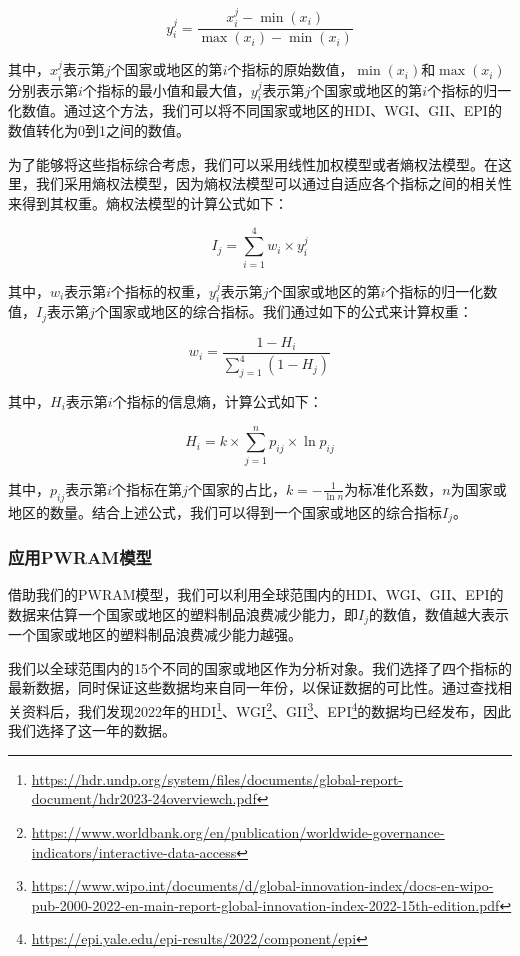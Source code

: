 \documentclass[UTF8, fontset=windows]{mcmthesis}
\begin{document}
\begin{equation}
y_{i}^{j} = \frac{x_{i}^{j} - \min(x_{i})}{\max(x_{i}) - \min(x_{i})}
\end{equation}

其中，$x_i^j$表示第$j$个国家或地区的第$i$个指标的原始数值，$\min(x_i)$和$\max(x_i)$分别表示第$i$个指标的最小值和最大值，$y_i^j$表示第$j$个国家或地区的第$i$个指标的归一化数值。通过这个方法，我们可以将不同国家或地区的HDI、WGI、GII、EPI的数值转化为0到1之间的数值。

为了能够将这些指标综合考虑，我们可以采用线性加权模型或者熵权法模型。在这里，我们采用熵权法模型，因为熵权法模型可以通过自适应各个指标之间的相关性来得到其权重。熵权法模型的计算公式如下：

\begin{equation}
I_j = \sum_{i=1}^{4} w_i \times y_i^j
\end{equation}

其中，$w_i$表示第$i$个指标的权重，$y_i^j$表示第$j$个国家或地区的第$i$个指标的归一化数值，$I_j$表示第$j$个国家或地区的综合指标。我们通过如下的公式来计算权重：

\begin{equation}
w_i = \frac{1 - H_i}{\sum_{j=1}^{4} (1 - H_j)}
\end{equation}

其中，$H_i$表示第$i$个指标的信息熵，计算公式如下：

\begin{equation}
H_i = k \times \sum_{j=1}^{n} p_{ij} \times \ln p_{ij}
\end{equation}

其中，$p_{ij}$表示第$i$个指标在第$j$个国家的占比，$k=-\frac{1}{\ln n}$为标准化系数，$n$为国家或地区的数量。结合上述公式，我们可以得到一个国家或地区的综合指标$I_j$。

\subsubsection{应用PWRAM模型}

借助我们的PWRAM模型，我们可以利用全球范围内的HDI、WGI、GII、EPI的数据来估算一个国家或地区的塑料制品浪费减少能力，即$I_j$的数值，数值越大表示一个国家或地区的塑料制品浪费减少能力越强。

我们以全球范围内的15个不同的国家或地区作为分析对象。我们选择了四个指标的最新数据，同时保证这些数据均来自同一年份，以保证数据的可比性。通过查找相关资料后，我们发现2022年的HDI\footnote{\url{https://hdr.undp.org/system/files/documents/global-report-document/hdr2023-24overviewch.pdf}}、WGI\footnote{\url{https://www.worldbank.org/en/publication/worldwide-governance-indicators/interactive-data-access}}、GII\footnote{\url{https://www.wipo.int/documents/d/global-innovation-index/docs-en-wipo-pub-2000-2022-en-main-report-global-innovation-index-2022-15th-edition.pdf}}、EPI\footnote{\url{https://epi.yale.edu/epi-results/2022/component/epi}}的数据均已经发布，因此我们选择了这一年的数据。
\end{document}
